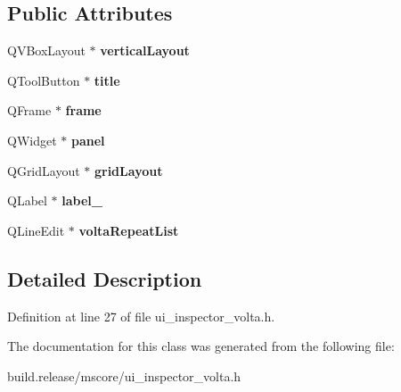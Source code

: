 \subsection*{Public Attributes}
\begin{DoxyCompactItemize}
\item 
\mbox{\label{class_ui___inspector_volta_a22287a1cadf1660d21fd7f6d3f4e8183}} 
Q\+V\+Box\+Layout $\ast$ {\bfseries vertical\+Layout}
\item 
\mbox{\label{class_ui___inspector_volta_a68e4539574c9d6bb4618529307b28947}} 
Q\+Tool\+Button $\ast$ {\bfseries title}
\item 
\mbox{\label{class_ui___inspector_volta_a3a95a4b23fab22f6ff6175db33bf4b0f}} 
Q\+Frame $\ast$ {\bfseries frame}
\item 
\mbox{\label{class_ui___inspector_volta_a006768f0ec3894f778d3d6fe9c7a42c7}} 
Q\+Widget $\ast$ {\bfseries panel}
\item 
\mbox{\label{class_ui___inspector_volta_a683716a0467b06c561018a9e71f64eba}} 
Q\+Grid\+Layout $\ast$ {\bfseries grid\+Layout}
\item 
\mbox{\label{class_ui___inspector_volta_ae4abb572ad3520250b81430c1221745f}} 
Q\+Label $\ast$ {\bfseries label\+\_}
\item 
\mbox{\label{class_ui___inspector_volta_a4483ef2b522da9a312d585cb89c12469}} 
Q\+Line\+Edit $\ast$ {\bfseries volta\+Repeat\+List}
\end{DoxyCompactItemize}


\subsection{Detailed Description}


Definition at line 27 of file ui\+\_\+inspector\+\_\+volta.\+h.



The documentation for this class was generated from the following file\+:\begin{DoxyCompactItemize}
\item 
build.\+release/mscore/ui\+\_\+inspector\+\_\+volta.\+h\end{DoxyCompactItemize}
